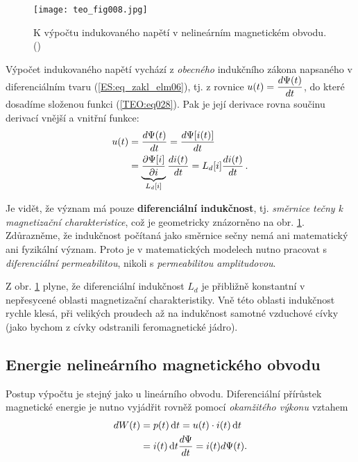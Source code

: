       \begin{figure}[ht!]  %
        \centering
        \texttt{[image: teo\_fig008.jpg]}
        \caption{K výpočtu indukovaného napětí v nelineárním magnetickém obvodu. 
                (\cite[s.~157]{Patocka4})}
        \label{teo:fig008}
      \end{figure}
      
      Výpočet indukovaného napětí vychází z \emph{obecného} indukčního zákona napsaného v 
      diferenciálním tvaru (\ref{ES:eq_zakl_elm06}), tj. z rovnice \(u(t) = \dfrac{d \Psi(t)}{d t}\), do 
      které dosadíme složenou funkci (\ref{TEO:eq028}). Pak je její derivace rovna součinu derivací 
      vnější a vnitřní funkce:
      \begin{align}\label{TEO:eq030}
        u(t) &= \dfrac{d \Psi(t)}{d t} = \dfrac{d \Psi[i(t)]}{d t}                \nonumber \\
             &= \underbrace{\dfrac{\partial \Psi[i]}{\partial i}}_{L_d[i]}\dfrac{d i(t)}{d t} 
              = L_d[i]\dfrac{d i(t)}{d t}\,.
      \end{align}
      
      Je vidět, že význam má pouze \textbf{diferenciální indukčnost}, tj. \emph{směrnice tečny k 
      magnetizační charakteristice}, což je geometricky znázorněno na obr. \ref{teo:fig008}. 
      Zdůrazněme, že indukčnost počítaná jako směrnice sečny nemá ani matematický ani fyzikální 
      význam. Proto je v matematických modelech nutno pracovat s \emph{diferenciální 
      permeabilitou}, nikoli s \emph{permeabilitou amplitudovou}.
      
      Z obr. \ref{teo:fig008} plyne, že diferenciální indukčnost \(L_d\) je přibližně konstantní v 
      nepřesycené oblasti magnetizační charakteristiky. Vně této oblasti indukčnost rychle klesá, 
      při velikých proudech až na indukčnost samotné vzduchové cívky (jako bychom z cívky 
      odstranili feromagnetické jádro).
      
    \subsection{Energie nelineárního magnetického obvodu}
      Postup výpočtu je stejný jako u lineárního obvodu. Diferenciální přírůstek magnetické energie 
      je nutno vyjádřit rovněž pomocí \emph{okamžitého výkonu} vztahem
      \begin{align}\label{TEO:eq031}
        dW(t) &= p(t)\mathop{}\!\mathrm{d}t = u(t)\cdot i(t)\mathop{}\!\mathrm{d}t         \nonumber \\
              &= i(t)\mathop{}\!\mathrm{d}t\dfrac{d \Psi}{d t} = i(t)d\Psi(t).
      \end{align}

